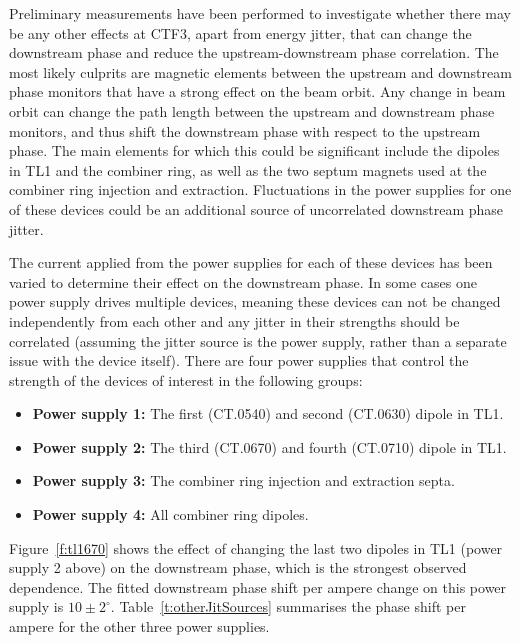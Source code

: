 Preliminary measurements have been performed to investigate whether there may be any other effects at CTF3, apart from energy jitter, that can change the downstream phase and reduce the upstream-downstream phase correlation. The most likely culprits are magnetic elements between the upstream and downstream phase monitors that have a strong effect on the beam orbit. Any change in beam orbit can change the path length between the upstream and downstream phase monitors, and thus shift the downstream phase with respect to the upstream phase. The main elements for which this could be significant include the dipoles in TL1 and the combiner ring, as well as the two septum magnets used  at the combiner ring injection and extraction. Fluctuations in the power supplies for one of these devices could be an additional source of uncorrelated downstream phase jitter.

The current applied from the power supplies for each of these devices has been varied to determine their effect on the downstream phase. In some cases one power supply drives multiple devices, meaning these devices can not be changed independently from each other and any jitter in their strengths should be correlated (assuming the jitter source is the power supply, rather than a separate issue with the device itself). There are four power supplies that control the strength of the devices of interest in the following groups:
\begin{itemize}
\item \textbf{Power supply 1:} The first (CT.0540) and second (CT.0630) dipole in TL1.
\item \textbf{Power supply 2:} The third (CT.0670) and fourth (CT.0710) dipole in TL1.
\item \textbf{Power supply 3:} The combiner ring injection and extraction septa.
\item \textbf{Power supply 4:} All combiner ring dipoles.
\end{itemize}

Figure~\ref{f:tl1670} shows the effect of changing the last two dipoles in TL1 (power supply 2 above) on the downstream phase, which is the strongest observed dependence. The fitted downstream phase shift per ampere change on this power supply is \(10\pm2^\circ\). Table~\ref{t:otherJitSources} summarises the phase shift per ampere for the other three power supplies. 

